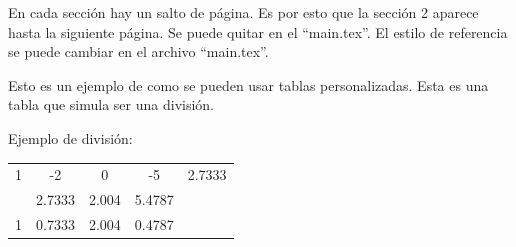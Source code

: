 En cada sección hay un salto de página. Es por esto que la sección 2 aparece hasta la siguiente página. Se puede quitar en el “main.tex”. El estilo de referencia se puede cambiar en el archivo “main.tex”.

Esto es un ejemplo de como se pueden usar tablas personalizadas. Esta es una tabla que simula ser una división. 


Ejemplo de división:

\begin{table}[H]
\begin{center}
\begin{tabular}{  c  c  c  c | c}

1 & -2 & 0 & -5 & 2.7333\\
  & 2.7333 & 2.004 & 5.4787\\ \hline
1 & 0.7333 & 2.004 & 0.4787 \cellcolor[HTML]{E3F772} & 

\end{tabular}

\end{center}
\end{table}
